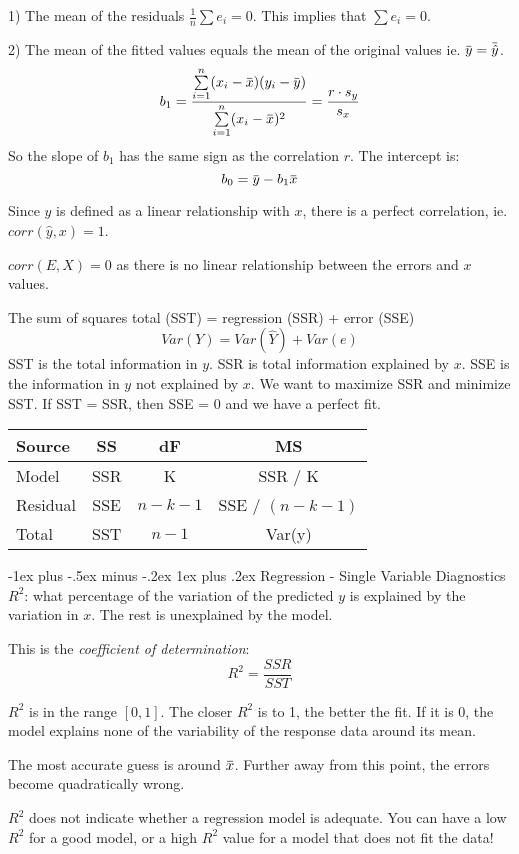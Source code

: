 \documentclass[10pt,landscape]{article}
\makeatletter
\renewcommand{\subsubsection}{\@startsection{subsubsection}{3}{0mm}%
                                {-1ex plus -.5ex minus -.2ex}%
                                {1ex plus .2ex}%
                                {\normalfont\small\bfseries}}
\newcommand{\overbar}[1]{\mkern 1.5mu\overline{\mkern-1.5mu#1\mkern-1.5mu}\mkern 1.5mu}
\makeatother
\begin{document}
\begin{multicols*}{3}
1) The mean of the residuals $\frac{1}{n} \sum e_i = 0$. This implies that $\sum e_i = 0$.

2) The mean of the fitted values equals the mean of the original values ie. $\overbar{y} = \overbar{\hat{y}}$.
\[
b_1 = \frac{ \sum\limits_{i=1}^n (x_i - \overbar{x}) (y_i - \overbar{y}) } { \sum\limits_{i=1}^n (x_i - \overbar{x})^2}  = \frac{r\cdot s_y} { s_x}
\]
So the slope of $b_1$ has the same sign as the correlation $r$. The intercept is:
\[
b_0 = \overbar{y} - b_1\overbar{x}
\]

Since $\hat{y}$ is defined as a linear relationship with $x$, there is a perfect correlation, ie. $corr(\hat{y}, x) = 1$.

$corr(E, X) = 0$ as there is no linear relationship between the errors and $x$ values.

The sum of squares total (SST) = regression (SSR) + error (SSE)
\[
Var(Y) = Var(\hat{Y}) + Var(e)
\]
SST is the total information in $y$. SSR is total information explained by $x$. SSE is the information in $y$ not explained by $x$. We want to maximize SSR and minimize SST. If SST = SSR, then SSE = 0 and we have a perfect fit.

\begin{tabular} {l | c c c}
Source & SS & dF & MS \\
\hline
Model & SSR & K & SSR / K \\
Residual & SSE & $n-k-1$ & SSE / $(n - k -1)$ \\
\hline
Total & SST & $n-1$ & Var(y)
\end{tabular}

\subsubsection{Regression - Single Variable Diagnostics}
$R^2$: what percentage of the variation of the predicted $y$  is explained by the variation in $x$. The rest is unexplained by the model.

This is the \textit{coefficient of determination}:
\[
R^2 = \frac{SSR}{SST}
\]

$R^2$ is in the range $[0,1]$. The closer $R^2$ is to 1, the better the fit. If it is 0, the model explains none of the variability of the response data around its mean.

The most accurate guess is around $\overbar{x}$. Further away from this point, the errors become quadratically wrong.

$R^2$ does not indicate whether a regression model is adequate. You can have a low $R^2$ for a good model, or a high $R^2$ value for a model that does not fit the data! 


\end{multicols*}
\end{document}
